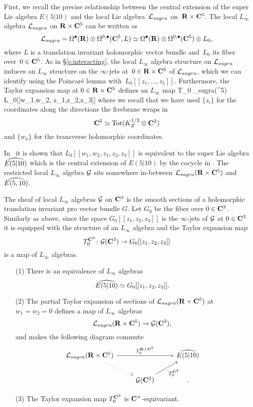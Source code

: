 \documentclass[11pt]{amsart}
\begin{document}
\parsec[]

First, we recall the precise relationship between the central extension of the super Lie algebra $E(5|10)$ and the local Lie algebra~$\cL_{sugra}$ on~$\R \times \C^5$.
The local $L_\infty$ algebra $\cL_{sugra}$ on $\R \times \C^5$ can be written as 
\[
\cL_{sugra} = \Omega^\bu(\R) \otimes \Omega^{0,\bu}(\C^5, L) \simeq \Omega^\bu(\R) \otimes \Omega^{0,\bu}(\C^5) \otimes L_0 ,
\]
where $L$ is a translation invariant holomorphic vector bundle and~$L_0$ its fiber over~$0 \in \C^5$.
As in \S \ref{s:interacting}, the local $L_\infty$ algebra structure on $\cL_{sugra}$ induces an $L_\infty$ structure on the $\infty$-jets at~$0 \in \R \times \C^5$ of $\cL_{sugra}$, which we can identify using the Poincar\'e lemma with~$L_0[[z_1,\ldots,z_5]]$.
Furthermore, the Taylor expansion map at $0 \in \R \times \C^5$ defines an $L_\infty$ map
\beqn
T_0 \colon \cL_{sugra}(\R \times \C^5) \to L_0[[w_1,w_2, z_1,z_2,z_3]] 
\eeqn
where we recall that we have used $\{z_i\}$ for the coordinates along the directions the fivebrane wraps in 
\[
\C^5 \simeq {\rm Tot}(K^{1/2}_Z \otimes \C^2)
\]
and $\{w_a\}$ for the transverse holomorphic coordinates. 

In~\cite{RSW} it is shown that $L_0[[w_1,w_2, z_1,z_2,z_3]]$ is equivalent to the super Lie algebra $\Hat{E(5|10)}$ which is the central extension of $E(5|10)$ by the cocycle in . 
The restricted local $L_\infty$ algebra $\cG$ sits somewhere in-between $\cL_{sugra}(\R \times \C^5)$ and $\Hat{E(5,10)}$. 

The sheaf of local $L_\infty$ algebras $\cG$ on $\C^3$ is the smooth sections of a holomorphic translation invariant pro vector bundle $G$. 
Let $G_0$ be the fiber over $0 \in \C^3$. 
Similarly as above, since the space $G_0[[z_1,z_2,z_3]]$ is the $\infty$-jets of $\cG$ at $0 \in \C^3$ it is equipped with the structure of an $L_\infty$ algebra and the Taylor expansion map 
\[
T_0^{\C^3} \colon \cG(\C^3) \to G_0[[z_1,z_2,z_3]] 
\]
is a map of $L_\infty$ algebras. 

\begin{lem}
\begin{itemize}
\item[(1)]
There is an equivalence of $L_\infty$ algebras
\[
\Hat{E(5|10)} \simeq G_0 [[z_1,z_2,z_3]] .
\]
\item[(2)]The partial Taylor expansion of sections of $\cL_{sugra}(\R \times \C^5)$ at $w_1=w_2 = 0$ defines a map of $L_\infty$ algebras 
\[
\cL_{sugra}(\R \times \C^5) \to \cG(\C^3) ,
\]
and makes the following diagram commute
\[
\begin{tikzcd}
\cL_{sugra}(\R \times \C^5) \ar[dr,dotted] \ar[rr,"T_0^{\R \times \C^5}"] & &  \Hat{E(5|10)} \\ 
& \cG(\C^3) \ar[ur,"T_0^{\C^3}"'] & .
\end{tikzcd} 
\]
\item[(3)] 
The Taylor expansion map $T_0^{\C^3}$ is $\C^\times$-equivariant. 
\end{itemize}
\end{lem}
\end{document}
